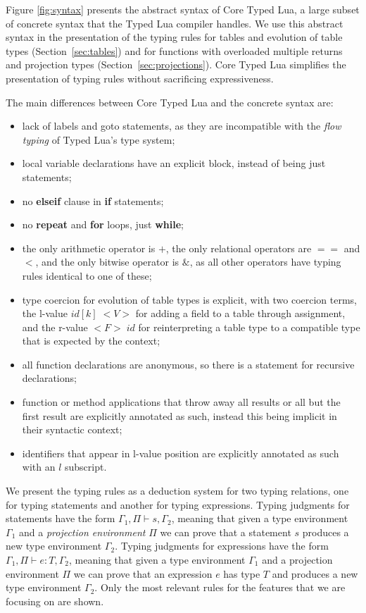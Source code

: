 \documentclass[10pt]{sigplanconf}
\newcommand{\env}{\Gamma}
\newcommand{\penv}{\Pi}
\begin{document}
Figure \ref{fig:syntax} presents the abstract syntax of 
Core Typed Lua, a large subset of concrete syntax
that the Typed Lua compiler handles. We use this abstract
syntax in the presentation of the typing rules
for tables and evolution of table types (Section~\ref{sec:tables})
and for functions with overloaded multiple returns and
projection types (Section~\ref{sec:projections}).
Core Typed Lua simplifies the presentation of typing rules
without sacrificing expressiveness.

The main differences between Core Typed Lua and the concrete
syntax are:
\begin{itemize}
\item lack of labels and goto statements, as they are incompatible
with the {\em flow typing} of Typed Lua's type system;
\item local variable declarations have an explicit block,
instead of being just statements;
\item no {\bf elseif} clause in {\bf if} statements;
\item no {\bf repeat} and {\bf for} loops, just {\bf while};
\item the only arithmetic operator is $+$, the only relational
operators are $==$ and $<$, and the only bitwise operator
is $\&$, as all other operators have typing rules identical to
one of these;
\item type coercion for evolution of table types is explicit,
with two coercion terms, the l-value $id[k] \; {<}V{>}$ for adding a field to 
a table through assignment, and the r-value ${<}F{>} \;id$ for reinterpreting
a table type to a compatible type that is expected by the context;
\item all function declarations are anonymous, so there is a
statement for recursive declarations;
\item function or method applications that throw away all
results or all but the first result are explicitly annotated
as such, instead this being implicit in their syntactic context;
\item identifiers that appear in l-value position are explicitly
annotated as such with an $l$ subscript.
\end{itemize}

We present the typing rules as a deduction system for two typing relations, one for typing statements and another for typing expressions. Typing judgments for statements have the form $\env_{1}, \penv \vdash s, \env_{2}$, meaning that
given a type environment $\env_{1}$ and a {\em projection environment} $\penv$ we can prove that a statement $s$ produces a new type environment $\env_{2}$. Typing judgments for
expressions have the form $\env_{1}, \penv \vdash e : T, \env_{2}$, meaning that given a type environment $\env_{1}$
and a projection environment $\penv$ we can prove that an expression $e$ has type $T$ and produces a new type environment $\env_{2}$.
Only the most relevant rules for the features that we are focusing on are shown.
\end{document}
